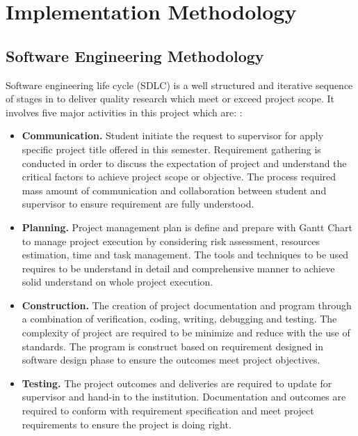 \chapter{Implementation Methodology} 

\label{Chapter4} 


\doublespacing


\section{Software Engineering Methodology}

Software engineering life cycle (SDLC) is a well structured and iterative sequence of stages in to deliver quality research which meet or exceed project scope. It involves five major activities in this project which are: :

\begin{itemize}[topsep=0pt,itemsep=-1ex,partopsep=1ex,parsep=1.5ex]
	
    \item \textbf{Communication.} Student initiate the request to supervisor for apply specific project title offered in this semester. Requirement gathering is conducted in order to discuss the expectation of project and understand the critical factors to achieve project scope or objective. The process required mass amount of communication and collaboration between student and supervisor to ensure requirement are fully understood. 
      
    \item \textbf{Planning.} Project management plan is define and prepare with Gantt Chart to manage project execution by considering risk assessment, resources estimation, time and task management. The tools and techniques to be used requires to be understand in detail and comprehensive manner to achieve solid understand on whole project execution. 
           
    \item \textbf{Construction.} The creation of project documentation and program through a combination of verification, coding, writing, debugging and testing. The complexity of project are required to be minimize and reduce with the use of standards. The program is construct based on requirement designed in software design phase to ensure the outcomes meet project objectives. 
    
    \item \textbf{Testing.} The project outcomes and deliveries are required to update for supervisor and hand-in to the institution. Documentation and outcomes are required to conform with requirement specification and meet project requirements to ensure the project is doing right. 
    
\end{itemize}


